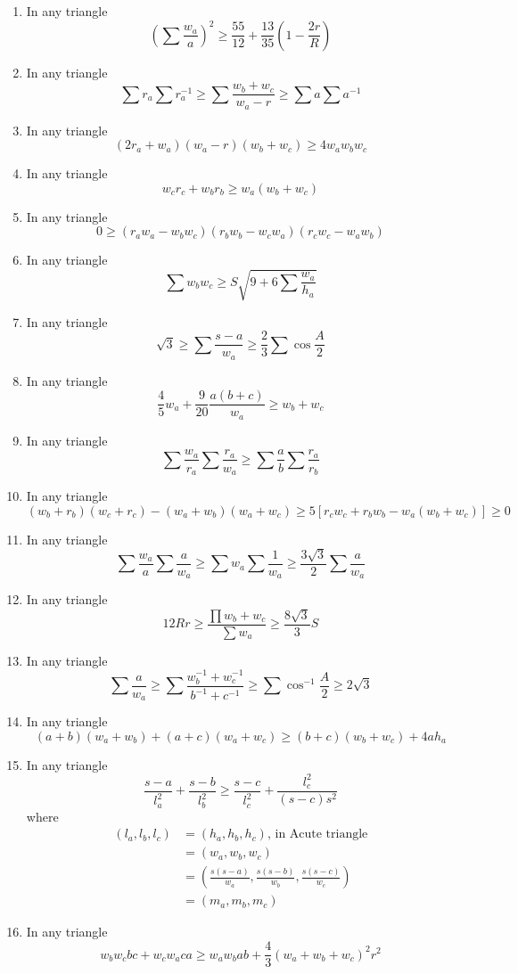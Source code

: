 \documentclass{report}
\begin{document}
\begin{enumerate}
	\item In any triangle$$ \left( \sum\frac {w_a}{a}\right) ^2\geq\frac {55}{12} + \frac {13}{35}\left( 1 - \frac {2r}{R}\right) $$
	\item In any triangle$$\sum{r_a}\sum{r_a^{ - 1}}\geq\sum\frac {w_b + w_c}{w_a - r}\geq \sum{a}\sum{a^{ - 1}}$$
	\item In any triangle$$(2r_a + w_a)(w_a - r)(w_b + w_c)\geq4w_aw_bw_c$$
	\item In any triangle$$w_cr_c + w_br_b\geq w_a(w_b + w_c)$$
	\item In any triangle$$0\geq (r_aw_a - w_bw_c)(r_bw_b - w_cw_a)(r_cw_c - w_aw_b)$$
	\item In any triangle$$\sum{w_bw_c}\geq S\sqrt {9 + 6\sum\frac {w_a}{h_a}}$$
	\item In any triangle$$\sqrt {3}\geq\sum\frac {s - a}{w_a}\geq\frac {2}{3}\sum\cos\frac {A}{2}$$
	\item In any triangle$$\frac {4}{5}w_a + \frac {9}{20}\frac {a(b + c)}{w_a}\geq w_b + w_c$$
	\item In any triangle$$\sum\frac {w_a}{r_a}\sum\frac {r_a}{w_a}\geq\sum\frac {a}{b}\sum\frac {r_a}{r_b}$$
	\item In any triangle$$ (w_b + r_b)(w_c + r_c) - (w_a + w_b)(w_a + w_c)\geq5[r_cw_c + r_bw_b - w_a(w_b + w_c)]\geq0$$	
	\item In any triangle$$ \sum\frac {w_a}{a}\sum\frac {a}{w_a}\geq\sum{w_a}\sum\frac {1}{w_a}\geq\frac {3\sqrt {3}}{2}\sum\frac {a}{w_a}$$
	\item In any triangle$$ 12Rr\geq\frac {\prod{w_b + w_c}}{\sum{w_a}}\geq\frac {8\sqrt {3}}{3}S$$	
	\item In any triangle$$\sum \frac{a}{w_a}\geq \sum \frac{w_b^{-1} + w_c^{-1}}{b^{-1} + c^{-1}}\geq\sum\cos^{-1}\frac{A}{2}\geq2\sqrt{3}$$
	\item In any triangle$$ (a + b)(w_a + w_b) + (a + c)(w_a + w_c)\geq (b + c)(w_b + w_c) + 4ah_a$$	
	\item In any triangle$$\frac {s - a}{l_a^2} + \frac {s - b}{l_b^2}\geq\frac {s - c}{l_c^2} + \frac {l_c^2}{(s - c)s^2}$$	where\begin{align*} (l_a,l_b,l_c) &= (h_a,h_b,h_c),\, \text{in Acute triangle}\\ &=  (w_a,w_b,w_c)\\ &= \left( \frac {s(s - a)}{w_a},\frac {s(s - b)}{w_b},\frac {s(s - c)}{w_c}\right)\\ &=  (m_a,m_b,m_c) \end{align*}
	\item In any triangle$$w_bw_cbc+w_cw_aca\geq w_aw_bab+\frac{4}{3}(w_a+w_b+w_c)^2r^2$$	

\end{enumerate}
\end{document}
